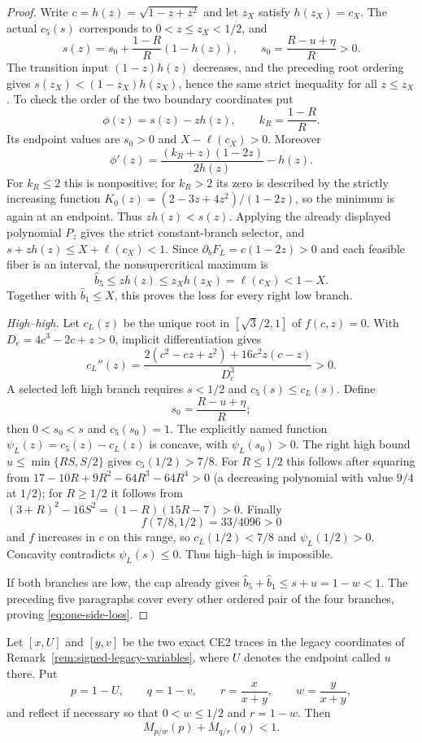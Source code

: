 \begin{proof}
Write $c=h(z)=\sqrt{1-z+z^2}$ and let $z_X$ satisfy $h(z_X)=c_X$.
The actual $c_5(s)$ corresponds to $0<z\le z_X<1/2$, and
\[
 s(z)=s_0+\frac{1-R}{R}(1-h(z)),\qquad
 s_0=\frac{R-u+\eta}{R}>0.
\]
The transition input $(1-z)h(z)$ decreases, and the preceding root ordering
gives $s(z_X)<(1-z_X)h(z_X)$, hence the same strict inequality for all
$z\le z_X$.  To check the order of the two boundary coordinates put
\[
 \phi(z)=s(z)-zh(z),\qquad k_R=\frac{1-R}{R}.
\]
Its endpoint values are $s_0>0$ and $X-\ell(c_X)>0$.  Moreover
\[
 \phi'(z)=\frac{(k_R+z)(1-2z)}{2h(z)}-h(z).
\]
For $k_R\le2$ this is nonpositive; for $k_R>2$ its zero is described by the
strictly increasing function
$K_0(z)=(2-3z+4z^2)/(1-2z)$, so the minimum is again at an endpoint.
Thus $zh(z)<s(z)$.  Applying the already displayed polynomial $P_z$ gives
the strict constant-branch selector, and
$s+zh(z)\le X+\ell(c_X)<1$.  Since
$\partial_bF_L=c(1-2z)>0$ and each feasible fiber is an interval, the nonsupercritical
maximum is
\[
 \widehat b_5\le zh(z)\le z_Xh(z_X)=\ell(c_X)<1-X.
\]
Together with $\widehat b_1\le X$, this proves the loss for every right low branch.

\smallskip\noindent
\emph{High--high.}
Let $c_L(z)$ be the unique root in $[\sqrt3/2,1]$ of $f(c,z)=0$.
With $D_c=4c^3-2c+z>0$, implicit differentiation gives
\[
 c_L''(z)=
 \frac{2(c^2-cz+z^2)+16c^2z(c-z)}{D_c^3}>0.
\]
A selected left high branch requires $s<1/2$ and $c_5(s)\le c_L(s)$.
Define
\[
 s_0=\frac{R-u+\eta}{R};
\]
then $0<s_0<s$ and $c_5(s_0)=1$.  The explicitly named function
$\psi_L(z)=c_5(z)-c_L(z)$ is concave, with $\psi_L(s_0)>0$.  The right high bound
$u\le\min\{RS,S/2\}$ gives $c_5(1/2)>7/8$.  For $R\le1/2$ this follows
after squaring from
$17-10R+9R^2-64R^3-64R^4>0$ (a decreasing polynomial with value $9/4$ at
$1/2$); for $R\ge1/2$ it follows from
$(3+R)^2-16S^2=(1-R)(15R-7)>0$.  Finally
\[
 f(7/8,1/2)=33/4096>0
\]
and $f$ increases in $c$ on this range, so $c_L(1/2)<7/8$ and
$\psi_L(1/2)>0$.  Concavity contradicts $\psi_L(s)\le0$.  Thus high--high is
impossible.

If both branches are low, the cap already gives
$\widehat b_5+\widehat b_1\le s+u=1-w<1$.  The preceding five paragraphs cover every other
ordered pair of the four branches, proving \eqref{eq:one-side-loss}.
\end{proof}

\begin{lemma}
\label{lem:two-endpoint-capped-loss}
\label{thm:s2-geom-e2}
Let $[x,U]$ and $[y,v]$ be the two exact CE2 traces in the legacy
coordinates of Remark~\ref{rem:signed-legacy-variables}, where $U$ denotes
the endpoint called $u$ there.  Put
\[
 p=1-U,\qquad q=1-v,\qquad
 r=\frac{x}{x+y},\qquad w=\frac{y}{x+y},
\]
and reflect if necessary so that $0<w\le1/2$ and $r=1-w$.  Then
\begin{equation}
 \overline M_{p/w}(p)+\overline M_{q/r}(q)<1.
 \label{eq:two-endpoint-loss}
\end{equation}
\end{lemma}

